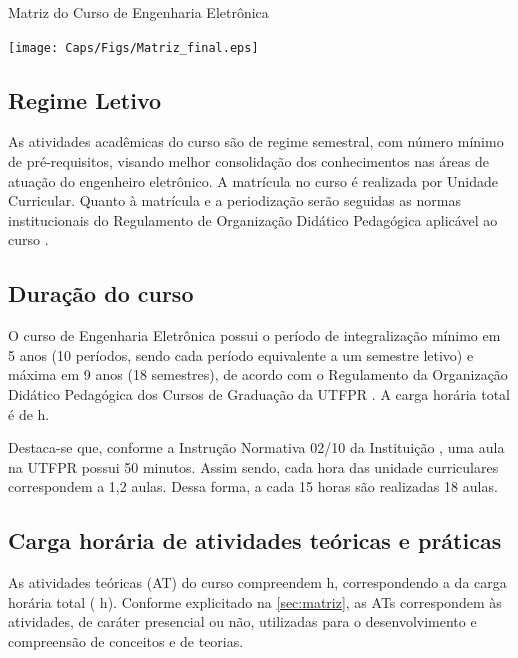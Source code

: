 \begin{landscape}
	\begin{quadro}
		\centering
		\caption{Matriz do Curso de Engenharia Eletrônica}
		\texttt{[image: Caps/Figs/Matriz\_final.eps]}
		\fonte{\utf}
		\label{qua:matriz}
	\end{quadro}
\end{landscape}
\restoregeometry



\subsection{Regime Letivo}
\label{sub:reg}

As atividades acadêmicas do curso são de regime semestral, com número mínimo de pré-requisitos, visando melhor consolidação dos conhecimentos nas áreas de atuação do engenheiro eletrônico. A matrícula no curso é realizada por Unidade Curricular. Quanto à matrícula e a periodização serão seguidas as normas institucionais do Regulamento de Organização Didático Pedagógica aplicável ao curso \cite{rodp}.

\subsection{Duração do curso}

O curso de Engenharia Eletrônica possui o período de integralização mínimo em 5 anos (10 períodos, sendo cada período equivalente a um semestre letivo) e máxima em 9 anos (18 semestres), de acordo com o Regulamento da Organização Didático Pedagógica dos Cursos de Graduação da UTFPR \cite{rodp}. A carga horária total é de \the\value{horasT} h. 

Destaca-se que, conforme a Instrução Normativa 02/10 da Instituição \cite{in2:2010:prograd}, uma aula na UTFPR possui 50 minutos. Assim sendo, cada hora das unidade curriculares correspondem a 1,2 aulas. Dessa forma, a cada 15 horas são realizadas 18 aulas.

\subsection{Carga horária de atividades teóricas e práticas}

As atividades teóricas (AT) do curso compreendem \the\value{horasAT} h, correspondendo a \percentagem{\the\value{horasAT}}{\the\value{horasT}} da carga horária total (\the\value{horasT} h). Conforme explicitado na \autoref{sec:matriz}, as ATs correspondem às atividades, de caráter presencial ou não, utilizadas para o desenvolvimento e compreensão de conceitos e de teorias.

